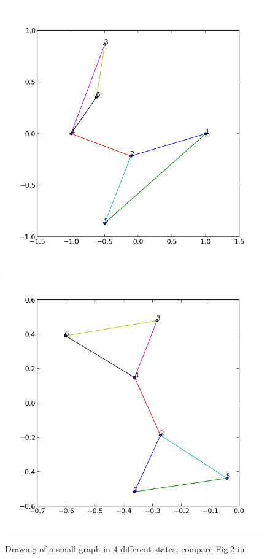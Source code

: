 \documentclass[12pt,a4paper]{article}
\begin{document}
\begin{figure}
\begin{minipage}[b]{.24\textwidth}
			\end{minipage}
			\begin{minipage}[b]{.24\textwidth}
			\centering
			\includegraphics[width=1.\textwidth]{ex1p2}\\
			\end{minipage}\hfill
			\begin{minipage}[b]{.24\textwidth}
			\centering
			\includegraphics[width=1.\textwidth]{ex1p49}\\
			\end{minipage}\hfill

		\caption{Drawing of a small graph in 4 different states, compare Fig.2 in \cite{TomihisaKamada1989}}\label{fig: 1}
\end{figure}
\end{document}
